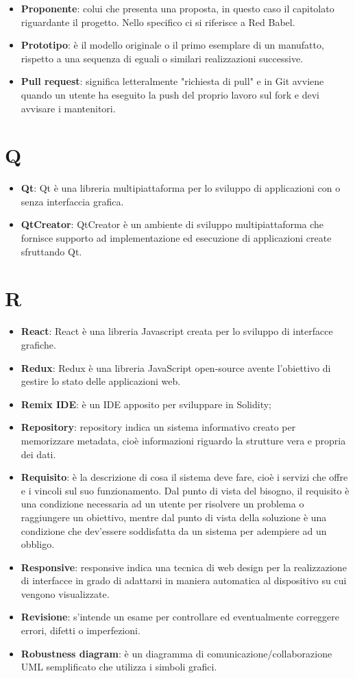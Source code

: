 \documentclass[a4paper, oneside, openany, dvipsnames, table]{article}
\begin{document}
\begin{itemize}
\item \textbf{Proponente}: colui che presenta una proposta, in questo caso il capitolato riguardante il progetto. Nello specifico ci si riferisce a Red Babel.
\item \textbf{Prototipo}: è il modello originale o il primo esemplare di un manufatto, rispetto a una sequenza di eguali o similari realizzazioni successive.
\item \textbf{Pull request}: significa letteralmente "richiesta di pull" e in Git avviene quando un utente ha eseguito la push del proprio lavoro sul fork e devi avvisare i mantenitori.
\end{itemize}

\section{Q}
\begin{itemize}
\item \textbf{Qt}: Qt è una libreria multipiattaforma per lo sviluppo di applicazioni con o senza interfaccia grafica.
\item \textbf{QtCreator}: QtCreator è un ambiente di sviluppo multipiattaforma che fornisce supporto ad implementazione ed esecuzione di applicazioni create sfruttando Qt.
\end{itemize}

\section{R}
\begin{itemize}
\item \textbf{React}: React è una libreria Javascript creata per lo sviluppo di interfacce grafiche.
\item \textbf{Redux}: Redux è una libreria JavaScript open-source avente l'obiettivo di gestire lo stato delle applicazioni web.
\item \textbf{Remix IDE}: è un IDE apposito per sviluppare in Solidity;
\item \textbf{Repository}: repository indica un sistema informativo creato per memorizzare metadata, cioè informazioni riguardo la strutture vera e propria dei dati.
\item \textbf{Requisito}: è la descrizione di cosa il sistema deve fare, cioè i servizi che offre e i vincoli sul suo funzionamento. Dal punto di vista del bisogno, il requisito è una condizione necessaria ad un utente per risolvere un problema o raggiungere un obiettivo, mentre dal punto di vista della soluzione è una condizione che dev'essere soddisfatta da un sistema per adempiere ad un obbligo.
\item \textbf{Responsive}: responsive indica una tecnica di web design per la realizzazione di interfacce in grado di adattarsi in maniera automatica al dispositivo su cui vengono visualizzate.
\item \textbf{Revisione}: s'intende un esame per controllare ed eventualmente correggere errori, difetti o imperfezioni.
\item \textbf{Robustness diagram}: è un diagramma di comunicazione/collaborazione UML semplificato che utilizza i simboli grafici.
\end{itemize}
\end{document}
